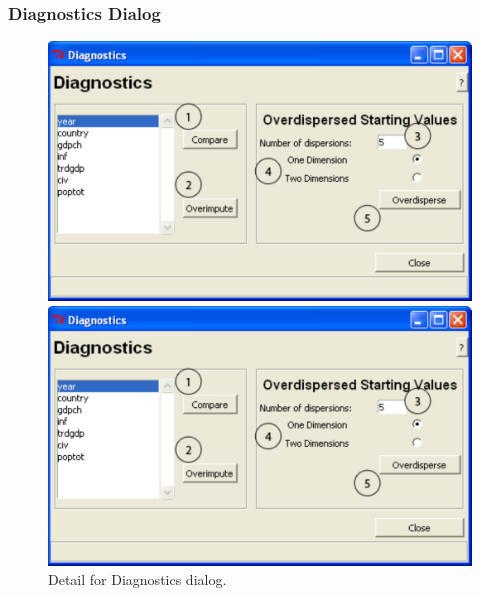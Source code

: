 \documentclass[12pt,titlepage]{article}
\begin{document}
\subsubsection{Diagnostics Dialog}
\label{sec:diagdiag}
\begin{figure}[ht]
  \centering
  \begin{htmlonly} 
    \includegraphics[scale=1]{diag} 
  \end{htmlonly}
  \begin{latexonly}
    \includegraphics[scale=.75]{diag}
  \end{latexonly}
  \caption{Detail for Diagnostics dialog.}
\end{figure}
\end{document}

